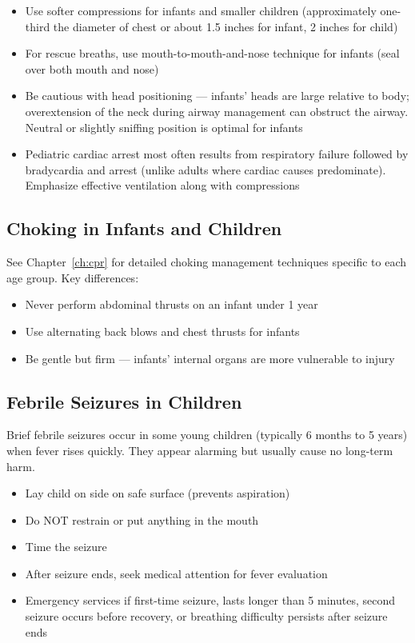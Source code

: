 \begin{itemize}[leftmargin=*]
  \item Use softer compressions for infants and smaller children (approximately one-third the diameter of chest or about 1.5 inches for infant, 2 inches for child)
  \item For rescue breaths, use mouth-to-mouth-and-nose technique for infants (seal over both mouth and nose)
  \item Be cautious with head positioning — infants' heads are large relative to body; overextension of the neck during airway management can obstruct the airway. Neutral or slightly sniffing position is optimal for infants
  \item Pediatric cardiac arrest most often results from respiratory failure followed by bradycardia and arrest (unlike adults where cardiac causes predominate). Emphasize effective ventilation along with compressions
\end{itemize}

\subsection{Choking in Infants and Children}

See Chapter~\ref{ch:cpr} for detailed choking management techniques specific to each age group. Key differences:

\begin{itemize}[leftmargin=*]
  \item Never perform abdominal thrusts on an infant under 1 year
  \item Use alternating back blows and chest thrusts for infants
  \item Be gentle but firm — infants' internal organs are more vulnerable to injury
\end{itemize}

\subsection{Febrile Seizures in Children}

Brief febrile seizures occur in some young children (typically 6 months to 5 years) when fever rises quickly. They appear alarming but usually cause no long-term harm.

\begin{itemize}[leftmargin=*]
  \item Lay child on side on safe surface (prevents aspiration)
  \item Do NOT restrain or put anything in the mouth
  \item Time the seizure
  \item After seizure ends, seek medical attention for fever evaluation
  \item Emergency services if first-time seizure, lasts longer than 5 minutes, second seizure occurs before recovery, or breathing difficulty persists after seizure ends
\end{itemize}


